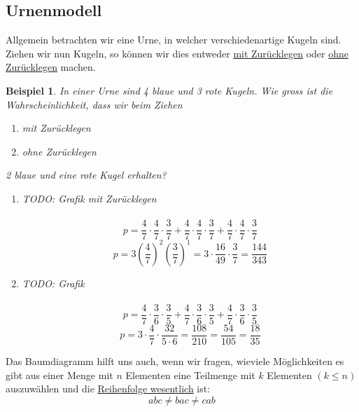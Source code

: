 \documentclass{report}
\newtheorem{myexample}{Beispiel}
\begin{document}
\subsection{Urnenmodell}
Allgemein betrachten wir eine Urne, in welcher verschiedenartige Kugeln sind. Ziehen wir nun Kugeln, so können wir dies entweder \underline{mit Zurücklegen} oder \underline{ohne Zurücklegen} machen.
\begin{myexample}
In einer Urne sind 4 blaue und 3 rote Kugeln. Wie gross ist die Wahrscheinlichkeit, dass wir beim Ziehen
\begin{enumerate}
\item
mit Zurücklegen
\item
ohne Zurücklegen
\end{enumerate}
2 blaue und eine rote Kugel erhalten?
\begin{enumerate}
\item
TODO: Grafik mit Zurücklegen\\\\
\begin{equation}
p = \frac{4}{7} \cdot \frac{4}{7} \cdot \frac{3}{7} + \frac{4}{7} \cdot \frac{4}{7} \cdot \frac{3}{7} + \frac{4}{7} \cdot \frac{4}{7} \cdot \frac{3}{7}
\end{equation}
\begin{equation}
p = 3 \left(\frac{4}{7}\right)^2\left(\frac{3}{7}\right)^1 = 3 \cdot \frac{16}{49} \cdot \frac{3}{7} = \frac{144}{343}
\end{equation}
\item
TODO: Grafik\\\\
\begin{equation}
p = \frac{4}{7} \cdot \frac{3}{6} \cdot \frac{3}{5} + \frac{4}{7} \cdot \frac{3}{6} \cdot \frac{3}{5} +\frac{4}{7} \cdot \frac{3}{6} \cdot \frac{3}{5}
\end{equation}
\begin{equation}
p = 3 \cdot \frac{4}{7} \cdot \frac{32}{5 \cdot 6} = \frac{108}{210} = \frac{54}{105} = \frac{18}{35}
\end{equation}
\end{enumerate}
\end{myexample}
Das Baumdiagramm hilft uns auch, wenn wir fragen, wieviele Möglichkeiten es gibt aus einer Menge mit $n$ Elementen eine Teilmenge mit $k$ Elementen $(k \leq n)$ auszuwählen und die \underline{Reihenfolge wesentlich} ist:
\begin{equation}
abc \neq bac \neq cab
\end{equation}
\end{document}
